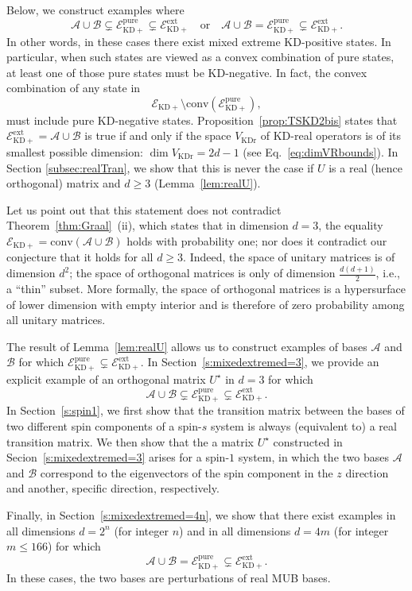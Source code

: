 \documentclass[a4paper, notitlepage, 11pt]{article}
\numberwithin{equation}{section}
\newcommand{\Acal}{{\mathcal A}}
\newcommand{\Bcal}{{\mathcal B}}
\newcommand{\EcalKDC}{{\mathcal E}_{\mathrm{KD+}}}
\newcommand{\EcalKDCpu}{{\mathcal E}_{\mathrm{KD+}}^{\mathrm{pure}}}
\newcommand{\EcalKDCext}{{\mathcal E}_{\mathrm{KD+}}^{\mathrm{ext}}}
\newcommand{\conv}[1]{\mathrm{conv}\left(#1\right)}
\newcommand{\VR}{V_{\mathrm{KDr}}}
\newcommand{\convAB}{\conv{\Acal \cup \Bcal}}
\begin{document}
Below, we construct examples where
$$
\Acal\cup\Bcal\subsetneq \EcalKDCpu\subsetneq \EcalKDCext\quad \textrm{or}\quad \Acal\cup\Bcal = \EcalKDCpu\subsetneq \EcalKDCext.
$$
In other words, in these cases there exist mixed extreme KD-positive states. In particular, when such states are viewed as a convex combination of pure states, at least one of those pure states must be KD-negative. In fact, the convex combination of any state in
$$
\EcalKDC\setminus \conv{\EcalKDCpu},
$$
must include pure KD-negative states.
Proposition~\ref{prop:TSKD2bis} states that $\EcalKDCext=\Acal\cup\Bcal$ is true if and only if the space $\VR$ of KD-real operators is of its smallest possible dimension: $\dim \VR = 2d-1$ (see Eq.~\eqref{eq:dimVRbounds}). In Section \ref{subsec:realTran}, we show  that this is never the case if $U$ is a real (hence orthogonal) matrix and $d\geq 3$ (Lemma~\ref{lem:realU}). 



Let us point out that this statement does not contradict Theorem~\ref{thm:Graal}~(ii), which states that in dimension $d=3$, the equality $\EcalKDC=\convAB$ holds with probability one; nor does it contradict our conjecture that it holds for all $d\geq 3$. Indeed, the space of unitary matrices is of dimension $d^2$; the space of orthogonal matrices is only of dimension $\frac{d(d+1)}{2}$, i.e., a ``thin'' subset. More formally, the space of orthogonal matrices is a hypersurface of lower dimension with empty interior and is therefore of zero probability among all unitary matrices. 


 The result  of Lemma~\ref{lem:realU} allows us to construct examples  of bases $\Acal$ and $\Bcal$ for which $\EcalKDCpu\subsetneq\EcalKDCext$. 
In Section~\ref{s:mixedextremed=3}, we  provide an explicit example of an orthogonal matrix $U^\star$ in $d=3$ for which
$$
\Acal\cup\Bcal\subsetneq \EcalKDCpu\subsetneq \EcalKDCext.
$$
In Section~\ref{s:spin1}, we first show that the transition matrix between the bases of two different spin components of a spin-$s$ system is always (equivalent to) a real transition matrix. 
We then show that the a matrix $U^\star$ constructed in Secion~\ref{s:mixedextremed=3}  arises for a spin-$1$ system, in which the two bases $\Acal$ and $\Bcal$ correspond to the eigenvectors of the spin component in the $z$ direction and another, specific direction, respectively. 


Finally, in Section~\ref{s:mixedextremed=4n}, we show that there exist examples in all dimensions $d=2^n$ (for integer $n$) and in all dimensions $d=4m$ (for integer $m \leq 166$)  for which 
$$
\Acal\cup\Bcal = \EcalKDCpu\subsetneq \EcalKDCext.
$$
In these cases, the two bases are perturbations of real MUB bases.  
\end{document}
